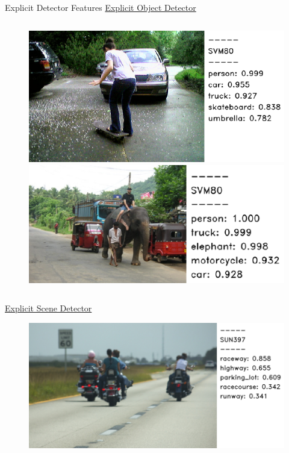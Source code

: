 \documentclass{beamer}
\begin{document}
\begin{frame}{Explicit Detector Features}
        \underline{Explicit Object Detector}
  \begin{figure}[h]
    \begin{columns}
    \centering
    \includegraphics[width=1.0\textwidth]{images/16285.pdf}
    \hspace{-5mm}
    \centering
    \includegraphics[width=1.0\textwidth]{images/450728.pdf}
    \end{columns}
  \end{figure}
  \underline{Explicit Scene Detector}
  \begin{figure}[h]
    \begin{columns}
    \centering
    \includegraphics[width=1.0\textwidth]{images/503790.png}

\end{columns}
\end{figure}
\end{frame}
\end{document}

